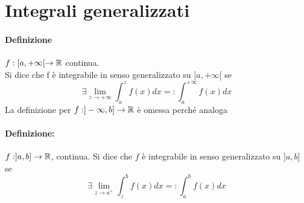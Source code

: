 \documentclass{article}
\begin{document}
\section{Integrali generalizzati}
\paragraph{Definizione} $f:[a,+ \infty[ \to \mathbb{R}$ continua. \\ Si dice che f è integrabile in senso generalizzato su $[a,+\infty[$ se
$$
\exists \lim_{z \to + \infty} \int_a^z f(x)dx =: \int_a^{+ \infty} f(x)dx
$$
La definizione per $f : ]-\infty,b] \to \mathbb{R}$ è omessa perché analoga

\paragraph{Definizione:} $f:]a,b] \to \mathbb{R}$, continua. Si dice che $f$ è integrabile in senso generalizzato su $]a,b]$ se 
$$
\exists \lim_{z \to a^+} \int_z^b f(x)dx =: \int_a^b f(x)dx
$$
\end{document}

